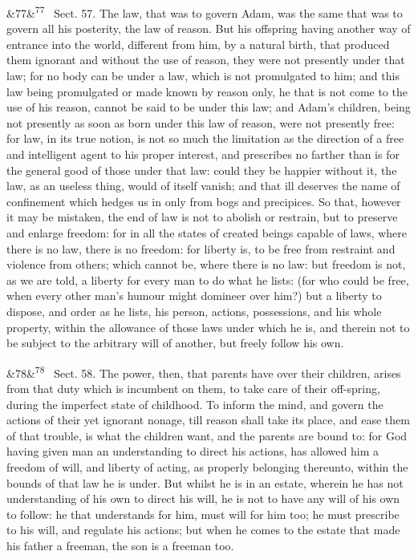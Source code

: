 \documentclass[12pt]{article}
\newcommand{\para}[1][]{\par\noindent\ifx&#1&\else\textsuperscript{\footnotesize #1}~\fi}
\begin{document}
\para[77] Sect. 57. The law, that was to govern Adam, was the same that was to govern all his posterity, the law of reason. But his offspring having another way of entrance into the world, different from him, by a natural birth, that produced them ignorant and without the use of reason, they were not presently under that law; for no body can be under a law, which is not promulgated to him; and this law being promulgated or made known by reason only, he that is not come to the use of his reason, cannot be said to be under this law; and Adam's children, being not presently as soon as born under this law of reason, were not presently free: for law, in its true notion, is not so much the limitation as the direction of a free and intelligent agent to his proper interest, and prescribes no farther than is for the general good of those under that law: could they be happier without it, the law, as an useless thing, would of itself vanish; and that ill deserves the name of confinement which hedges us in only from bogs and precipices. So that, however it may be mistaken, the end of law is not to abolish or restrain, but to preserve and enlarge freedom: for in all the states of created beings capable of laws, where there is no law, there is no freedom: for liberty is, to be free from restraint and violence from others; which cannot be, where there is no law: but freedom is not, as we are told, a liberty for every man to do what he lists: (for who could be free, when every other man's humour might domineer over him?) but a liberty to dispose, and order as he lists, his person, actions, possessions, and his whole property, within the allowance of those laws under which he is, and therein not to be subject to the arbitrary will of another, but freely follow his own.

\para[78] Sect. 58. The power, then, that parents have over their children, arises from that duty which is incumbent on them, to take care of their off-spring, during the imperfect state of childhood. To inform the mind, and govern the actions of their yet ignorant nonage, till reason shall take its place, and ease them of that trouble, is what the children want, and the parents are bound to: for God having given man an understanding to direct his actions, has allowed him a freedom of will, and liberty of acting, as properly belonging thereunto, within the bounds of that law he is under. But whilst he is in an estate, wherein he has not understanding of his own to direct his will, he is not to have any will of his own to follow: he that understands for him, must will for him too; he must prescribe to his will, and regulate his actions; but when he comes to the estate that made his father a freeman, the son is a freeman too.
\end{document}

